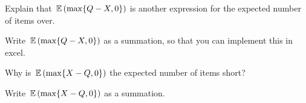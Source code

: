 \begin{exercise}
  Explain that $\,\mathbb{E}\,( \max\{Q-X, 0\})$ is another expression for the expected number of items over.

\end{exercise}

\begin{exercise}
  Write $\,\mathbb{E}\, (\max\{Q-X, 0\}) $ as a summation, so that you can implement this in excel.

\end{exercise}


\begin{exercise}
  Why is $ \,\mathbb{E}\,( \max\{X-Q, 0\})$ the expected number of items short?

\end{exercise}

\begin{exercise}
  Write $\,\mathbb{E}\, (\max\{X-Q, 0\}) $ as a summation.

\end{exercise}


